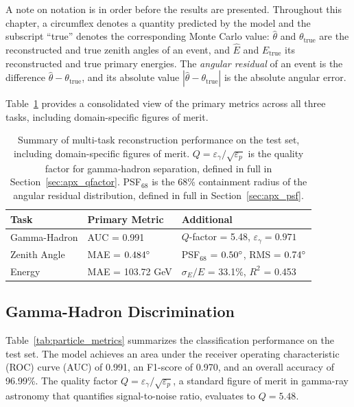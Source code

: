 A note on notation is in order before the results are presented. Throughout this chapter, a circumflex denotes a quantity predicted by the model and the subscript ``true'' denotes the corresponding Monte Carlo value: $\hat{\theta}$ and $\theta_\text{true}$ are the reconstructed and true zenith angles of an event, and $\hat{E}$ and $E_\text{true}$ its reconstructed and true primary energies. The \textit{angular residual} of an event is the difference $\hat{\theta} - \theta_\text{true}$, and its absolute value $|\hat{\theta} - \theta_\text{true}|$ is the absolute angular error.

Table~\ref{tab:performance_summary} provides a consolidated view of the primary metrics across all three tasks, including domain-specific figures of merit.

\begin{table}[ht!]
\centering
\caption[Summary of multi-task reconstruction performance.]{Summary of multi-task reconstruction performance on the test set, including domain-specific figures of merit. $Q = \varepsilon_\gamma / \sqrt{\varepsilon_p}$ is the quality factor for gamma-hadron separation, defined in full in Section~\ref{sec:apx_qfactor}. PSF$_{68}$ is the 68\% containment radius of the angular residual distribution, defined in full in Section~\ref{sec:apx_psf}.}
\label{tab:performance_summary}
\setlength{\tabcolsep}{8pt}
\renewcommand{\arraystretch}{1.2}
\begin{tabular}{lll}
\toprule
\textbf{Task} & \textbf{Primary Metric} & \textbf{Additional} \\
\midrule
Gamma-Hadron   & AUC = 0.991      & $Q$-factor = 5.48, $\varepsilon_\gamma = 0.971$ \\
Zenith Angle   & MAE = $0.484\degree$ & PSF$_{68}$ = $0.50\degree$, RMS = $0.74\degree$ \\
Energy         & MAE = 103.72 GeV & $\sigma_E / E$ = 33.1\%, $R^2$ = 0.453 \\
\bottomrule
\end{tabular}
\end{table}

\subsection{Gamma-Hadron Discrimination}
\label{subsec:particle}

Table~\ref{tab:particle_metrics} summarizes the classification performance on the test set. The model achieves an area under the receiver operating characteristic (ROC) curve (AUC) of 0.991, an F1-score of 0.970, and an overall accuracy of 96.99\%. The quality factor $Q = \varepsilon_\gamma / \sqrt{\varepsilon_p}$, a standard figure of merit in gamma-ray astronomy that quantifies signal-to-noise ratio, evaluates to $Q = 5.48$.

